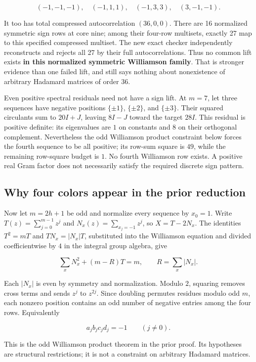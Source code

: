 \documentclass[
  11pt,
]{article}
\begin{document}
\[(-1,-1,-1),\quad(-1,1,1),\quad(-1,3,3),\quad(3,-1,-1).\]

It too has total compressed autocorrelation \((36,0,0)\). There are 16
normalized symmetric sign rows at core nine; among their four-row
multisets, exactly 27 map to this specified compressed multiset. The new
exact checker independently reconstructs and rejects all 27 by their
full autocorrelations. Thus no common lift exists \textbf{in this
normalized symmetric Williamson family}. That is stronger evidence than
one failed lift, and still says nothing about nonexistence of arbitrary
Hadamard matrices of order 36.

Even positive spectral residuals need not have a sign lift. At \(m=7\),
let three sequences have negative positions \(\{\pm1\}\), \(\{\pm2\}\),
and \(\{\pm3\}\). Their squared circulants sum to \(20I+J\), leaving
\(8I-J\) toward the target \(28I\). This residual is positive definite:
its eigenvalues are \(1\) on constants and \(8\) on their orthogonal
complement. Nevertheless the odd Williamson product constraint below
forces the fourth sequence to be all positive; its row-sum square is
\(49\), while the remaining row-square budget is \(1\). No fourth
Williamson row exists. A positive real Gram factor does not necessarily
satisfy the required discrete sign pattern.

\subsection{Why four colors appear in the prior
reduction}\label{why-four-colors-appear-in-the-prior-reduction}

Now let \(m=2h+1\) be odd and normalize every sequence by \(x_0=1\).
Write \(T(z)=\sum_{j=0}^{m-1}z^j\) and \(N_x(z)=\sum_{x_j=-1}z^j\), so
\(X=T-2N_x\). The identities \(T^2=mT\) and \(TN_x=|N_x|T\), substituted
into the Williamson equation and divided coefficientwise by \(4\) in the
integral group algebra, give

\[\sum_xN_x^2+(m-R)T=m,\qquad R=\sum_x|N_x|.\]

Each \(|N_x|\) is even by symmetry and normalization. Modulo \(2\),
squaring removes cross terms and sends \(z^j\) to \(z^{2j}\). Since
doubling permutes residues modulo odd \(m\), each nonzero position
contains an odd number of negative entries among the four rows.
Equivalently

\[a_jb_jc_jd_j=-1\qquad(j\ne0).\]

This is the odd Williamson product theorem in the prior proof. Its
hypotheses are structural restrictions; it is not a constraint on
arbitrary Hadamard matrices.
\end{document}

